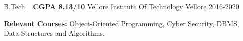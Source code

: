 \begin{cventries}
  \cventry
    { B.Tech. \textbar\ \textbf{CGPA 8.13/10} }
    { Vellore Institute Of Technology }
    { Vellore }
    { 2016-2020 }
    {
      \begin{cvitems}
        \item {\textbf{Relevant Courses:} Object-Oriented Programming, Cyber Security, DBMS, Data Structures and Algorithms.}
      \end{cvitems}
    }
\end{cventries}

